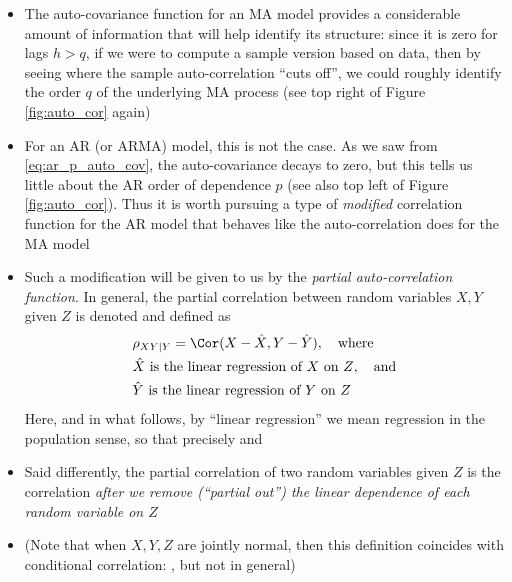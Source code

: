 \documentclass{article}
\begin{document}
\begin{itemize}
\item The auto-covariance function for an MA model provides a considerable
  amount of information that will help identify its structure: since it is zero
  for lags $h>q$, if we were to compute a sample version based on data, then by
  seeing where the sample auto-correlation ``cuts off'', we could roughly
  identify the order $q$ of the underlying MA process (see top right of Figure 
  \ref{fig:auto_cor} again)   

\item For an AR (or ARMA) model, this is not the case. As we saw from
  \eqref{eq:ar_p_auto_cov}, the auto-covariance decays to zero, but this tells
  us little about the AR order of dependence $p$ (see also top left of Figure 
  \ref{fig:auto_cor}). Thus it is worth pursuing a type of \emph{modified}
  correlation function for the AR model that behaves like the auto-correlation
  does for the MA model 

\item Such a modification will be given to us by the \emph{partial
    auto-correlation function}. In general, the partial correlation between
  random variables $X,Y$ given $Z$ is denoted  and defined
  as    
  \begin{align*}
  &\rho_{XY|Y} = \Cor(X - \hat{X}, Y - \hat{Y}), \quad \text{where} \\
  &\text{$\hat{X}$ is the linear regression of $X$ on $Z$}, \quad \text{and} \\
  &\text{$\hat{Y}$ is the linear regression of $Y$ on $Z$}
  \end{align*}
  Here, and in what follows, by ``linear regression'' we mean regression in the
  population sense, so that precisely  and    

\item Said differently, the partial correlation of two random variables given
  $Z$ is the correlation \emph{after we remove (``partial out'') the linear
    dependence of each random variable on $Z$}     

\item (Note that when $X,Y,Z$ are jointly normal, then this definition coincides
  with conditional correlation: , but not in
  general)  


\end{itemize}
\end{document}
